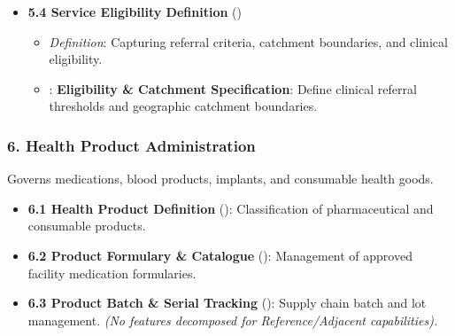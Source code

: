 \begin{itemize}
\begin{itemize}
\item
\emph{Definition}: Modeling regular operating hours, exceptional closures, and emergency availability.



\item
\texttt{}: \textbf{Operating Schedule Specification}: Define temporal availability, clinic operating hours, and on-call service windows.



\end{itemize}


\item
\textbf{5.4 Service Eligibility Definition} (\texttt{})


\begin{itemize}

\item
\emph{Definition}: Capturing referral criteria, catchment boundaries, and clinical eligibility.



\item
\texttt{}: \textbf{Eligibility \& Catchment Specification}: Define clinical referral thresholds and geographic catchment boundaries.



\end{itemize}


\end{itemize}
\label{rad:enabling:208}
\subsubsection*{6. Health Product Administration}
\label{rad:enabling:209}

Governs medications, blood products, implants, and consumable health goods.

\label{rad:enabling:210}

\begin{itemize}

\item
\textbf{6.1 Health Product Definition} (\texttt{}): Classification of pharmaceutical and consumable products.



\item
\textbf{6.2 Product Formulary \& Catalogue} (\texttt{}): Management of approved facility medication formularies.



\item
\textbf{6.3 Product Batch \& Serial Tracking} (\texttt{}): Supply chain batch and lot management. \emph{(No features decomposed for Reference/\allowbreak{}Adjacent capabilities).}



\end{itemize}
\label{rad:enabling:215}
